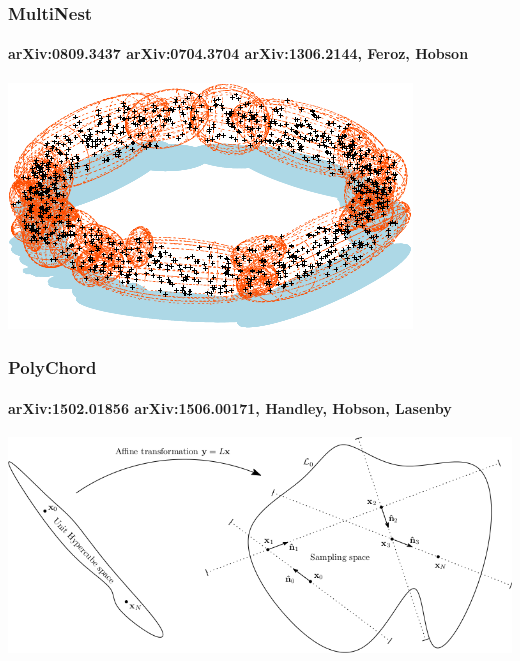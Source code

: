 \documentclass[%
]{beamer}
\begin{document}
\begin{frame}
\frametitle{MultiNest}
    \framesubtitle{arXiv:0809.3437 arXiv:0704.3704 arXiv:1306.2144, Feroz, Hobson}
  \includegraphics[width=\textwidth]{figures/multinest.pdf}
\end{frame}

\begin{frame}
  \frametitle{PolyChord}
  \framesubtitle{arXiv:1502.01856 arXiv:1506.00171, Handley, Hobson, Lasenby}
  \includegraphics[width=\textwidth]{figures/polychord.png}
\end{frame}
\end{document}
